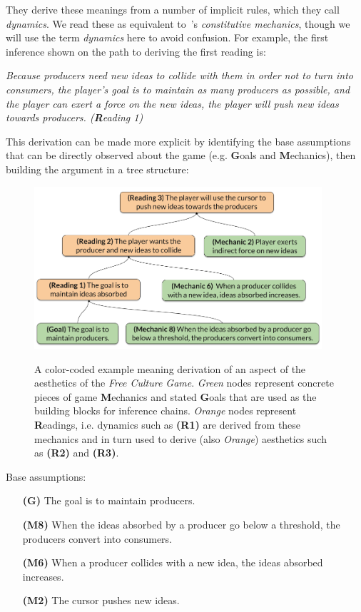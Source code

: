 \documentclass[12pt]{report}
\begin{document}
They derive these meanings from a number of implicit rules, which they call
\emph{dynamics}. We read these as equivalent to~\cite{salen2004rules}'s
\emph{constitutive mechanics}, though we will use the term \emph{dynamics}
here to avoid confusion. For example, the first inference shown on the path to deriving the first reading is:

{\em Because producers need new ideas to collide with them in order not to
turn into consumers, the player's goal is to maintain as many producers as
possible, and the player can exert a force on the new ideas, the player
will push new ideas towards producers. (\textbf{R}eading 1)}

This derivation can be made more explicit by identifying the base
assumptions that can be directly observed about the game (e.g. \textbf{G}oals and \textbf{M}echanics), then building the
argument in a tree structure:


\begin{figure}[ht]
\centering
\includegraphics[width=0.95\textwidth]{figures/Copy_of_Proceduralist_Reading.png}
\label{fig:free_culture}
\caption{A color-coded example meaning derivation of an aspect of the aesthetics of the \textit{Free Culture Game}.  \textit{Green} nodes represent concrete pieces of game \textbf{M}echanics and stated \textbf{G}oals that are used as the building blocks for inference chains.  \textit{Orange} nodes represent \textbf{R}eadings, i.e. dynamics such as \textbf{(R1)} are derived from these mechanics and in turn used to derive (also \textit{Orange}) aesthetics such as \textbf{(R2)} and \textbf{(R3)}.}
\end{figure}

Base assumptions:
\begin{itemize}
\item [\textbf{(G)}] The goal is to maintain producers.
\item [\textbf{(M8)}]When the ideas absorbed by a producer go below a threshold, the
producers convert into consumers.
\item [\textbf{(M6)}]When a producer collides with a new idea, the ideas absorbed
increases.
\item [\textbf{(M2)}] The cursor pushes new ideas.
\end{itemize}
\end{document}
